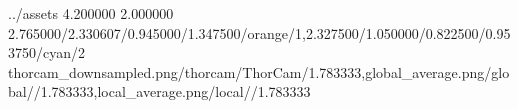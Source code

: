 \TrioComparisonFigure
    {../assets}
    {4.200000}
    {2.000000}
    {2.765000/2.330607/0.945000/1.347500/orange/1,2.327500/1.050000/0.822500/0.953750/cyan/2}
    {thorcam_downsampled.png/thorcam/ThorCam/1.783333,global_average.png/global//1.783333,local_average.png/local//1.783333}
